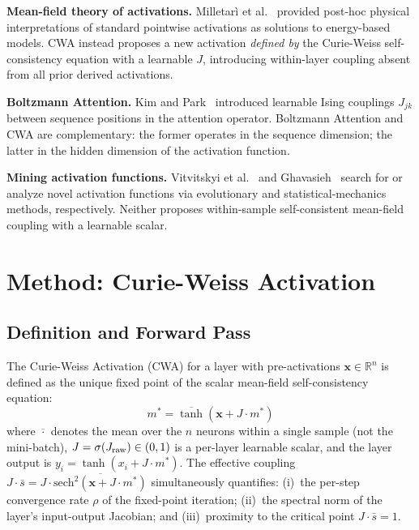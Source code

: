 \documentclass[11pt,twocolumn,letterpaper]{article}
\begin{document}
\textbf{Mean-field theory of activations.} Milletar\`i et al.~\cite{Milletari2018} provided post-hoc physical
interpretations of standard pointwise activations as solutions to energy-based models. CWA instead proposes a new
activation \emph{defined by} the Curie-Weiss self-consistency equation with a learnable $J$, introducing within-layer
coupling absent from all prior derived activations.

\textbf{Boltzmann Attention.} Kim and Park~\cite{Kim2026} introduced learnable Ising couplings $J_{jk}$ between sequence
positions in the attention operator. Boltzmann Attention and CWA are complementary: the former operates in the sequence
dimension; the latter in the hidden dimension of the activation function.

\textbf{Mining activation functions.} Vitvitskyi et al.~\cite{Vitvitskyi2026} and Ghavasieh~\cite{Ghavasieh2025} search
for or analyze novel activation functions via evolutionary and statistical-mechanics methods, respectively. Neither proposes
within-sample self-consistent mean-field coupling with a learnable scalar.

\section{Method: Curie-Weiss Activation}
\label{sec:method}

\subsection{Definition and Forward Pass}

The Curie-Weiss Activation (CWA) for a layer with pre-activations $\mathbf{x} \in \mathbb{R}^n$ is defined as the unique
fixed point of the scalar mean-field self-consistency equation:
\begin{equation}
  m^* = \overline{\tanh}(\mathbf{x} + J\cdot m^*)
\end{equation}
where $\overline{\cdot}$ denotes the mean over the $n$ neurons within a single sample (not the mini-batch),
$J = \sigma(J_{\rm raw}) \in (0,1)$ is a per-layer learnable scalar, and the layer output is
$y_i = \tanh(x_i + J\cdot m^*)$. The effective coupling
$J\cdot\bar{s} = J\cdot\overline{\text{sech}^2(\mathbf{x}+J\cdot m^*)}$ simultaneously quantifies:
(i)~the per-step convergence rate $\rho$ of the fixed-point iteration; (ii)~the spectral norm of the layer's input-output
Jacobian; and (iii)~proximity to the critical point $J\cdot\bar{s} = 1$.
\end{document}
